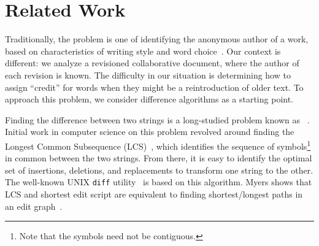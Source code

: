 \section{Related Work}
\label{sec:diff-related}

Traditionally, the  problem is one of
identifying the anonymous author of a work, based on characteristics of
writing style and word choice~\cite{Juola2006}.
Our context is different: we analyze a revisioned collaborative
document, where the author of each revision is known.
The difficulty in our situation is determining how to assign ``credit''
for words when they might be a reintroduction of older text.
To approach this problem, we consider difference algorithms as a
starting point.

Finding the difference between two strings is a long-studied problem
known as ~\cite{Wagner1974}.
Initial work in computer science on this problem revolved around finding the
Longest Common Subsequence (LCS)~\cite{Gusfield1999}, which identifies the
sequence of symbols\footnote{Note that the symbols need not be
contiguous.}
in common between the two strings.
From there, it is easy to identify the optimal
set of insertions, deletions, and replacements to transform
one string to the other.
The well-known UNIX \texttt{diff} utility~\cite{Hunt1976} is based
on this algorithm.
Myers shows that LCS and shortest edit script are equivalent to finding
shortest/longest paths in an edit graph~\cite{Myers1986}.

